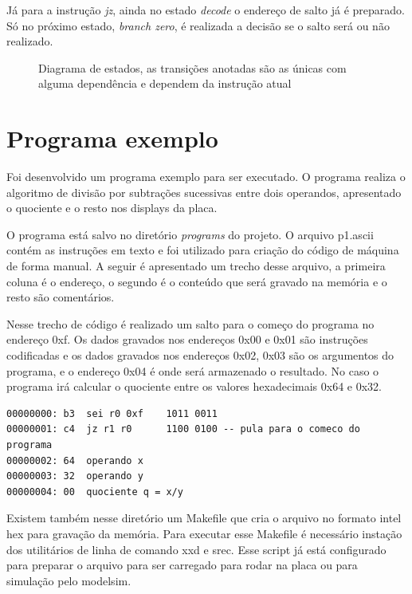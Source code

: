 \documentclass[a4paper, 12pt]{article}
\begin{document}
Já para a instrução \textit{jz}, ainda no estado \textit{decode} o endereço de salto já é preparado.
Só no próximo estado, \textit{branch zero}, é realizada a decisão se o salto será ou não realizado. 

\begin{figure}[ht]
	\centering
    \def\svgwidth{\columnwidth}
    
	\caption{Diagrama de estados, as transições anotadas são as únicas com alguma dependência e dependem da instrução atual}
	\label{fig:states}
\end{figure}

\newpage
\section{Programa exemplo}

Foi desenvolvido um programa exemplo para ser executado. O programa realiza o algoritmo de divisão
por subtrações sucessivas entre dois operandos, apresentado o quociente e o resto nos displays da placa.

O programa está salvo no diretório \textit{programs} do projeto. 
O arquivo p1.ascii contém as instruções em texto e foi utilizado para criação do código de máquina de forma manual.
A seguir é apresentado um trecho desse arquivo, a primeira coluna é o endereço, o segundo é o conteúdo que será 
gravado na memória e o resto são comentários.

Nesse trecho de código é realizado um salto para o começo do programa no endereço 0xf.
Os dados gravados nos endereços 0x00 e 0x01 são instruções codificadas e os dados
gravados nos endereços 0x02, 0x03 são os argumentos do programa, e o endereço 0x04 é onde será armazenado o resultado.
No caso o programa irá calcular o quociente entre os valores hexadecimais 0x64 e 0x32.

\begin{verbatim}
00000000: b3  sei r0 0xf    1011 0011
00000001: c4  jz r1 r0      1100 0100 -- pula para o comeco do programa
00000002: 64  operando x
00000003: 32  operando y
00000004: 00  quociente q = x/y
\end{verbatim}

Existem também nesse diretório um Makefile que cria o arquivo no formato intel hex para gravação da memória.
Para executar esse Makefile é necessário instação dos utilitários de linha de comando xxd e srec.
Esse script já está configurado para preparar o arquivo para ser carregado para rodar na placa ou para simulação
pelo modelsim.
\end{document}
